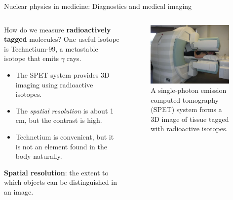\documentclass{beamer}
\begin{document}
\begin{frame}{Nuclear physics in medicine: Diagnostics and medical imaging}
\begin{columns}[T]
\begin{column}{0.5\textwidth}
\footnotesize
How do we measure \textbf{\alert{radioactively tagged}} molecules?  One useful isotope is Technetium-99, a metastable isotope that emits $\gamma$ rays.
\begin{itemize}
\item The SPET system provides 3D imaging using radioactive isotopes.
\item The \textit{spatial resolution} is about 1 cm, but the contrast is high.
\item Technetium is convenient, but it is not an element found in the body naturally.
\end{itemize}
\textbf{Spatial resolution}: the extent to which objects can be distinguished in an image.
\end{column}
\begin{column}{0.5\textwidth}
\begin{figure}
\centering
\includegraphics[width=0.95\textwidth]{figures/SPET.png}
\caption{\label{fig:medicine_2} A single-photon emission computed tomography (SPET) system forms a 3D image of tissue tagged with radioactive isotopes.}
\end{figure}
\end{column}
\end{columns}
\end{frame}
\end{document}
